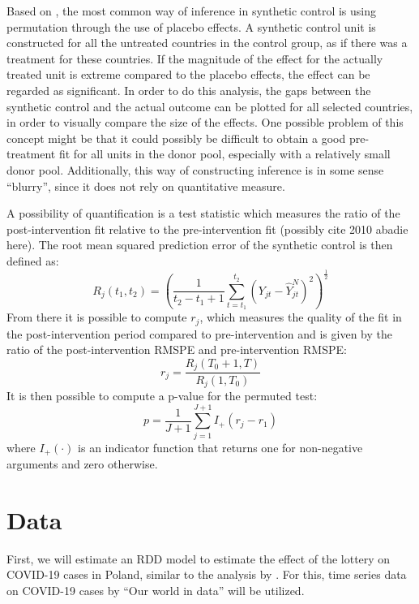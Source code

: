 \documentclass{scrbook}
\begin{document}
Based on \textcite{abadie_synthetic_2010}, the most common way of
inference in synthetic control is using permutation through the use of
placebo effects. A synthetic control unit is constructed for all the
untreated countries in the control group, as if there was a treatment
for these countries. If the magnitude of the effect for the actually
treated unit is extreme compared to the placebo effects, the effect can
be regarded as significant. In order to do this analysis, the gaps
between the synthetic control and the actual outcome can be plotted for
all selected countries, in order to visually compare the size of the
effects. One possible problem of this concept might be that it could
possibly be difficult to obtain a good pre-treatment fit for all units
in the donor pool, especially with a relatively small donor pool.
Additionally, this way of constructing inference is in some sense
``blurry'', since it does not rely on quantitative measure.

A possibility of quantification is a test statistic which measures the
ratio of the post-intervention fit relative to the pre-intervention fit
(possibly cite 2010 abadie here). The root mean squared prediction error
of the synthetic control is then defined as: \begin{equation}
R_{j}(t_{1},t_{2}) =(\frac{1}{t_{2}-t_{1}+1}\sum_{t=t_{1}}^{t_{2}}(Y_{jt}-\hat{Y}_{jt}^{N})^2)^\frac{1}{2}
\end{equation} From there it is possible to compute \(r_{j}\), which
measures the quality of the fit in the post-intervention period compared
to pre-intervention and is given by the ratio of the post-intervention
RMSPE and pre-intervention RMSPE: \begin{equation}
r_{j}=\frac{R_{j}(T_{0}+1,T)}{R_{j}(1,T_{0})}
\end{equation} It is then possible to compute a p-value for the permuted
test: \begin{equation}
p=\frac{1}{J+1}\sum_{j=1}^{J+1}I_{+}(r_{j}-r_{1})
\end{equation} where \(I_{+}(\cdot)\) is an indicator function that
returns one for non-negative arguments and zero otherwise.

\section{Data}

First, we will estimate an RDD model to estimate the effect of the
lottery on COVID-19 cases in Poland, similar to the analysis by
\textcite{kuznetsova_effectiveness_2022}. For this, time series data on
COVID-19 cases by ``Our world in data'' will be utilized.
\end{document}
